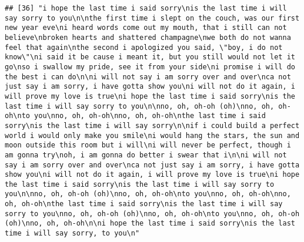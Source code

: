 \documentclass[]{article}
\begin{document}
\begin{verbatim}
## [36] "i hope the last time i said sorry\nis the last time i will say sorry to you\n\nthe first time i slept on the couch, was our first new year eve\ni heard words come out my mouth, that i still can not believe\nbroken hearts and shattered champagne\nwe both do not wanna feel that again\nthe second i apologized you said, \"boy, i do not know\"\ni said it be cause i meant it, but you still would not let it go\nso i swallow my pride, see it from your side\ni promise i will do the best i can do\n\ni will not say i am sorry over and over\nca not just say i am sorry, i have gotta show you\ni will not do it again, i will prove my love is true\ni hope the last time i said sorry\nis the last time i will say sorry to you\n\nno, oh, oh-oh (oh)\nno, oh, oh-oh\nto you\nno, oh, oh-oh\nno, oh, oh-oh\nthe last time i said sorry\nis the last time i will say sorry\n\nif i could build a perfect world i would only make you smile\ni would hang the stars, the sun and moon outside this room but i will\ni will never be perfect, though i am gonna try\noh, i am gonna do better i swear that i\n\ni will not say i am sorry over and over\nca not just say i am sorry, i have gotta show you\ni will not do it again, i will prove my love is true\ni hope the last time i said sorry\nis the last time i will say sorry to you\n\nno, oh, oh-oh (oh)\nno, oh, oh-oh\nto you\nno, oh, oh-oh\nno, oh, oh-oh\nthe last time i said sorry\nis the last time i will say sorry to you\nno, oh, oh-oh (oh)\nno, oh, oh-oh\nto you\nno, oh, oh-oh (oh)\nno, oh, oh-oh\n\ni hope the last time i said sorry\nis the last time i will say sorry, to you\n"                                                                                                                                                                                                                                                                                                                                                                                                                                                                                                                                                                                                                                                                                                                                                                                                                                                                                                                                                                                                                                                                                                                                                                                                                                                                                                         

\end{verbatim}
\end{document}
